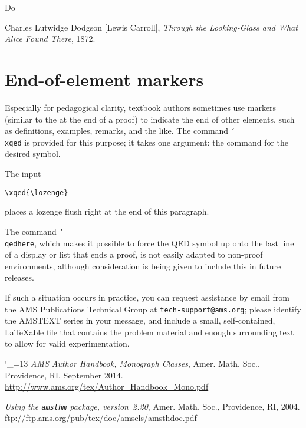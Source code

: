 \documentclass[multixcb]{amstext-l}
\theoremstyle{plain}
\theoremstyle{definition}
\newcommand{\cs}[1]{\texttt{\char`\\#1}}
\newcommand{\pkg}[1]{\texttt{#1}}
\newenvironment{exm}{%
  \par
  \begingroup
    \parindent0pt
    \leftskip2\normalparindent
    \obeylines
}{%
    \par
  \endgroup
}
\begin{document}
\renewcommand{\bibname}{References for this chapter}
\begin{inchapterbibliography}{Do}

 Charles Lutwidge Dodgson [Lewis Carroll],
  \textit{Through the Looking-Glass and What Alice Found There}, 1872.

\end{inchapterbibliography}

\section{End-of-element markers}

Especially for pedagogical clarity, textbook authors sometimes use
markers (similar to the {\qedsymbol} at the end of a proof) to
indicate the end of other elements, such as definitions, examples,
remarks, and the like.  The command \cs{xqed} is provided for this
purpose; it takes one argument: the command for the desired symbol.

The input\par\nobreak
\begin{exm}
\verb+\xqed{\lozenge}+
\end{exm}
\noindent
places a lozenge flush right at the end of this paragraph.
\xqed{\lozenge}

The command \cs{qedhere}, which makes it possible to force the
QED symbol up onto the last line of a display or list that ends
a proof, is not easily adapted to non-proof environments, although
consideration is being given to include this in future releases.

If such a situation occurs in practice, you can request assistance
by email from the AMS Publications Technical Group at
\texttt{tech-support@ams.org}; please identify the AMSTEXT series
in your message, and include a small, self-contained, {\LaTeX}able
file that contains the problem material and enough surrounding
text to allow for valid experimentation.



\renewcommand{\bibname}{Bibliography}
\begin{thebibliography}{HANDBK}

\catcode`\_=13
 \textit{AMS Author Handbook, Monograph Classes},
  Amer. Math. Soc., Providence, RI, September 2014.
  \url{http://www.ams.org/tex/Author_Handbook_Mono.pdf}

 \textit{Using the \pkg{amsthm} package,
  version~\textup{2.20}}, Amer. Math. Soc., Providence, RI, 2004.
  \url{ftp://ftp.ams.org/pub/tex/doc/amscls/amsthdoc.pdf}

\end{thebibliography}
\end{document}
